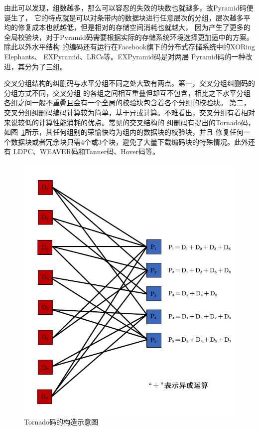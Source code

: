 由此可以发现，组数越多，那么可以容忍的失效的块数也就越多，故Pyramid码\cite{huang2013pyramid}便诞生了，
它的特点就是可以对条带内的数据块进行任意层次的分组，层次越多平均的修复成本也就越低，但是相对的存储空间消耗也就越大，
因为产生了更多的全局校验块，对于Pyramid码需要根据实际的存储系统环境选择更加适中的方案。除此以外水平结构
的编码还有运行在Facebook旗下的分布式存储系统中的XORing Elephants\cite{sathiamoorthy2013xoring}、
EXPyramid\cite{周松2011expyramid}、LRCs\cite{sathiamoorthy2013xoring}等。EXPyramid码是对两层
Pyramid码的一种改进，其分为了三组。

交叉分组结构的纠删码与水平分组不同之处大致有两点。第一，交叉分组纠删码的分组方式不同，交叉分组
的各组之间相互重叠但却互不包含，相比之下水平分组各组之间一般不重叠且会有一个全局的校验块包含着各个分组的校验块。
第二，交叉分组纠删码编码计算较为简单，基于异或计算。不难看出，交叉分组有着相对来说较低的计算性能消耗的优点。常见的交叉结构的
纠删码有\citet{woitaszek2007tornado}提出的Tornado码，如图~\ref{fig:con-1.8}所示，其任何组别的荣愉快均为组内的数据块的校验块，并且
修复任何一个数据块或者冗余块只需4个或3个块，避免了大量下载编码块的特殊情况。此外还有
LDPC\cite{gallager1962low}、WEAVER码\cite{hafner2005weaver}和Tanner码、Hover码\cite{hafner2006hover}等。


\begin{figure}[b]
	\centering
	\includegraphics [scale=0.7]{figures/1.8.pdf}
	\caption{Tornado码的构造示意图}
	\label{fig:con-1.8}
\end{figure}




